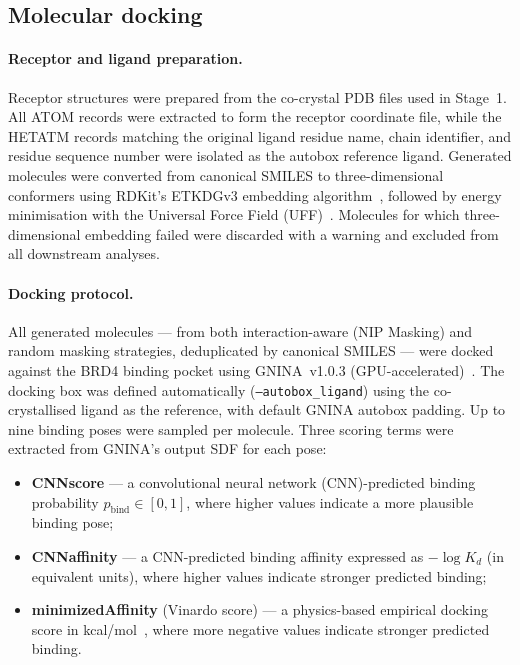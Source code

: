 \documentclass[a4paper,12pt]{article}
\begin{document}
\subsection{Molecular docking }
 
\paragraph{Receptor and ligand preparation.}
Receptor structures were prepared from the co-crystal PDB files
used in Stage~1.
All ATOM records were extracted to form the receptor coordinate
file, while the HETATM records matching the original ligand
residue name, chain identifier, and residue sequence number were
isolated as the autobox reference ligand.
Generated molecules were converted from canonical SMILES to
three-dimensional conformers using RDKit's ETKDGv3 embedding
algorithm~\cite{riniker2015}, followed by energy minimisation
with the Universal Force Field (UFF)~\cite{rappe1992uff}.
Molecules for which three-dimensional embedding failed were
discarded with a warning and excluded from all downstream
analyses.
 
\paragraph{Docking protocol.}
All generated molecules — from both interaction-aware (NIP Masking) and
random masking strategies, deduplicated by canonical SMILES —
were docked against the BRD4 binding pocket using GNINA~v1.0.3
(GPU-accelerated)~\cite{mcnunn2021gnina}.
The docking box was defined automatically (\texttt{--autobox\_ligand})
using the co-crystallised ligand as the reference, with default
GNINA autobox padding.
Up to nine binding poses were sampled per molecule.
Three scoring terms were extracted from GNINA's output SDF
for each pose:
 
\begin{itemize}
    \item \textbf{CNNscore} — a convolutional neural network (CNN)-predicted
          binding probability $p_{\mathrm{bind}} \in [0, 1]$, where
          higher values indicate a more plausible binding pose;
    \item \textbf{CNNaffinity} — a CNN-predicted binding affinity
          expressed as $-\!\log K_d$ (in equivalent units), where
          higher values indicate stronger predicted binding;
    \item \textbf{minimizedAffinity} (Vinardo score) — a physics-based
          empirical docking score in kcal/mol~\cite{quiroga2016vinardo},
          where more negative values indicate stronger predicted binding.
\end{itemize}
 
\end{document}
